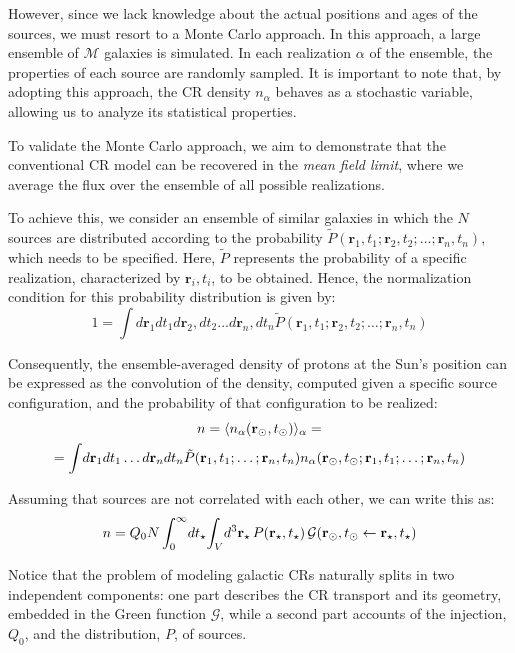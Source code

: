 However, since we lack knowledge about the actual positions and ages of the sources, we must resort to a Monte Carlo approach. In this approach, a large ensemble of $\mathcal{M}$ galaxies is simulated. In each realization $\alpha$ of the ensemble, the properties of each source are randomly sampled. It is important to note that, by adopting this approach, the CR density $n_\alpha$ behaves as a stochastic variable, allowing us to analyze its statistical properties.

To validate the Monte Carlo approach, we aim to demonstrate that the conventional CR model can be recovered in the \emph{mean field limit}, where we average the flux over the ensemble of all possible realizations.

To achieve this, we consider an ensemble of similar galaxies in which the $N$ sources are distributed according to the probability $\tilde P(\mathbf{r}_1, t_1; \mathbf{r}_2, t_2; \dots; \mathbf{r}_n, t_n)$, which needs to be specified. Here, $\tilde P$ represents the probability of a specific realization, characterized by ${ \mathbf{r}_i, t_i }$, to be obtained.
%
Hence, the normalization condition for this probability distribution is given by:
%
\begin{equation}
1 = \int d\mathbf{r}_1 dt_1 d\mathbf{r}_2, dt_2 \dots d\mathbf{r}_n, dt_n \tilde P(\mathbf{r}_1, t_1; \mathbf{r}_2, t_2; \dots; \mathbf{r}_n, t_n)
\end{equation}

Consequently, the ensemble-averaged density of protons at the Sun's position can be expressed as the convolution of the density, computed given a specific source configuration, and the probability of that configuration to be realized:
%
\begin{multline}
n = \langle n_\alpha(\vb r_\odot, t_\odot) \rangle_\alpha = \\
= \int \! d\vb r_1 dt_1 \dots d\vb r_n dt_n \tilde P(\vb r_1, t_1; \dots; \vb r_n, t_n) n_\alpha(\vb r_\odot, t_\odot; \vb r_1, t_1; \dots; \vb r_n, t_n)
\end{multline}

Assuming that sources are not correlated with each other, we can write this as:
%
\begin{equation}
n = Q_0 N \int_0^{\infty} \! dt_\star \! \int_{V} \! d^3 \vb r_\star \, P(\vb r_\star, t_\star) \, {\mathcal G(\vb r_\odot, t_\odot \leftarrow \vb r_\star, t_\star)} 
\label{eq:greenn}
\end{equation}

Notice that the problem of modeling galactic CRs naturally splits in two independent components: one part describes the CR transport and its geometry, embedded in the Green function $\mathcal G$, while a second part accounts of the injection, $Q_0$, and the distribution, $P$, of sources.

